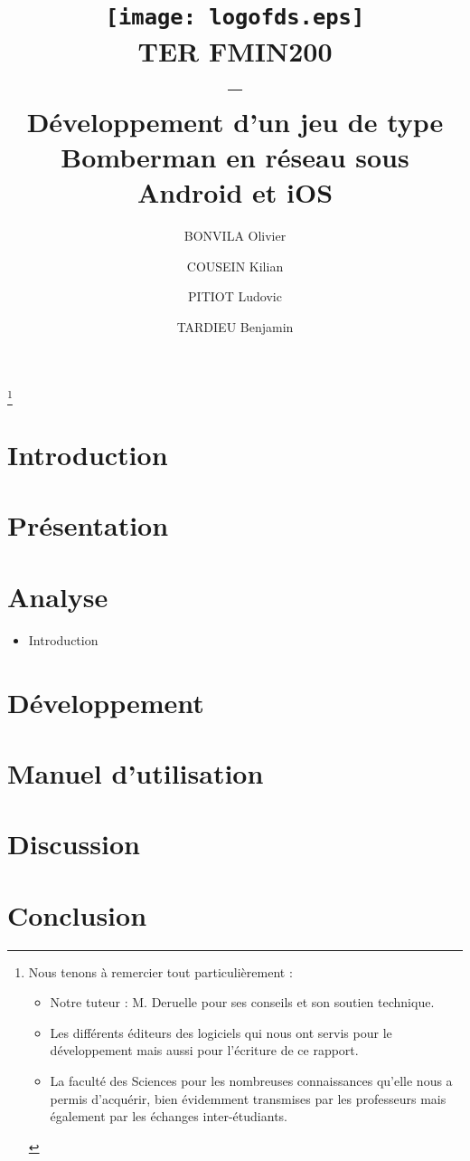 \documentclass[a4paper,11pt]{report}
\title{
	\texttt{[image: logofds.eps]}\\
	\vspace*{1cm}
	TER FMIN200 \\ 
	-- \\
	Développement d'un jeu de type Bomberman en réseau sous Android et iOS
}
\author{BONVILA Olivier \and COUSEIN Kilian \and PITIOT Ludovic \and TARDIEU Benjamin}
\date{}
\begin{document}
\maketitle

\thanks{

  Nous tenons à remercier tout particulièrement :
\begin{itemize}
	\item{Notre tuteur : M. Deruelle pour ses conseils et son soutien technique.}
	\item{Les différents  éditeurs des logiciels qui nous ont servis pour le développement mais aussi pour l’écriture de ce rapport.}
	\item{La faculté des Sciences pour les nombreuses connaissances qu’elle nous a permis d’acquérir, bien évidemment transmises par les professeurs mais également par les échanges inter-étudiants.}
\end{itemize}

}

\tableofcontents



\chapter{Introduction}

	

\chapter{Présentation}

	
	
	
\chapter{Analyse}
	\begin{itemize}
		\item{Introduction}
	\end{itemize}
	
	
	


\chapter{Développement}

	
	
		
		
		
\chapter{Manuel d'utilisation}

	

	

\chapter{Discussion}

	

	
\chapter{Conclusion}

	

\printglossaries
\end{document}
